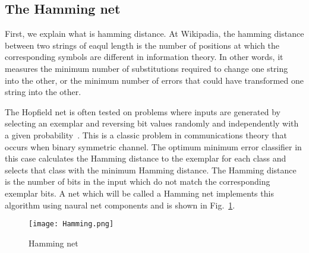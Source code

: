 \documentclass[10pt,twocolumn,letterpaper]{article}
\begin{document}
\subsection{The Hamming net}
\par First, we explain what is hamming distance. At Wikipadia, the hamming distance between two strings of eaqul length is the number of positions at which the corresponding symbols are different in information theory. In other words, it measures the minimum number of substitutions required to change one string into the other, or the minimum number of errors that could have transformed one string into the other.
\par The Hopfield net is often tested on problems where inputs are generated by selecting an exemplar and reversing bit values randomly and independently with a given probability~\cite{hopfield1982neural}. This is a classic problem in communications theory that occurs when binary symmetric channel. The optimum minimum error classifier in this case calculates the Hamming distance to the exemplar for each class and selects that class with the minimum Hamming distance. The Hamming distance is the number of bits in the input which do not match the corresponding exemplar bits. A net which will be called a Hamming net implements this algorithm using naural net components and is shown in Fig.~\ref{Hamming}.
 \begin{figure}[htbp]
 \centering{}
\texttt{[image: Hamming.png]}\\
 \caption{Hamming net}
\label{Hamming}
\end{figure}
 
 
\end{document}
